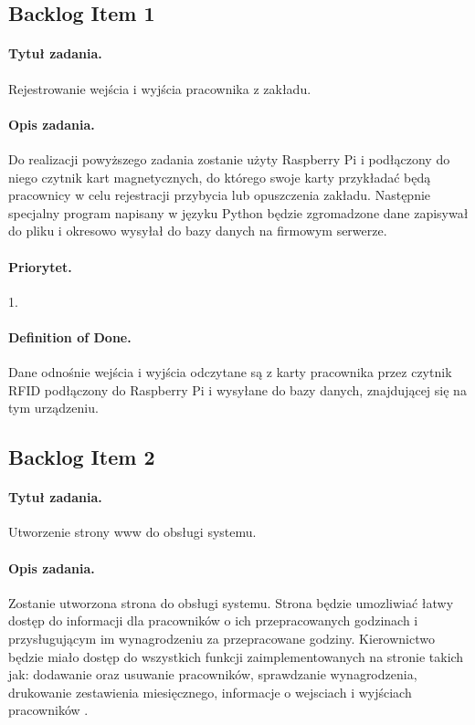 \documentclass[a4paper]{article}
\begin{document}
\subsection{Backlog Item 1}
\paragraph{Tytuł zadania.} Rejestrowanie wejścia i wyjścia pracownika z zakładu.
\paragraph{Opis zadania.} Do realizacji powyższego zadania zostanie użyty Raspberry Pi i podłączony do niego czytnik kart magnetycznych, do którego swoje karty przykładać będą pracownicy w celu rejestracji przybycia lub opuszczenia zakładu. Następnie specjalny program napisany w języku Python będzie zgromadzone dane zapisywał do pliku i okresowo wysyłał do bazy danych na firmowym serwerze.
\paragraph{Priorytet.} 1.
\paragraph{Definition of Done.} Dane odnośnie wejścia i wyjścia odczytane są z karty pracownika przez czytnik RFID podłączony do Raspberry Pi i wysyłane do bazy danych, znajdującej się na tym urządzeniu.

\subsection{Backlog Item 2}
\paragraph{Tytuł zadania.} Utworzenie strony www do obsługi systemu.
\paragraph{Opis zadania.} Zostanie utworzona strona do obsługi systemu. Strona będzie umozliwiać łatwy dostęp do informacji dla pracowników o ich przepracowanych godzinach i przysługującym im wynagrodzeniu za przepracowane godziny. Kierownictwo będzie miało dostęp do wszystkich funkcji zaimplementowanych na stronie takich jak: dodawanie oraz usuwanie pracowników, sprawdzanie wynagrodzenia, drukowanie zestawienia miesięcznego, informacje o wejsciach i wyjściach pracowników .  
\end{document}
